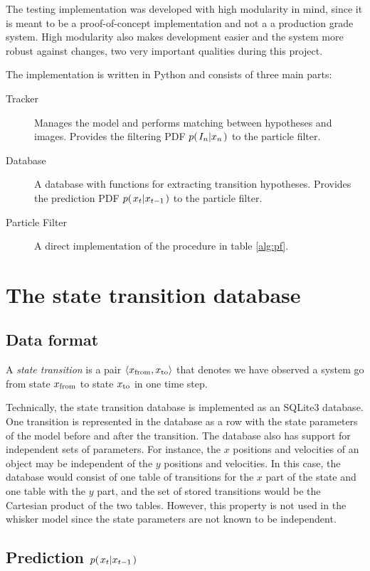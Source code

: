 The testing implementation was developed with high modularity in
mind, since it is meant to be a proof-of-concept implementation and
not a a production grade system. High modularity also makes
development easier and the system more robust against changes, two
very important qualities during this project.

The implementation is written in Python and consists of three main parts:
\begin{description}
  \item[Tracker] Manages the model and performs matching between
    hypotheses and images. Provides the filtering PDF
    $\cprob{I_n}{x_n}$ to the particle filter.
  \item[Database] A database with functions for extracting transition
    hypotheses. Provides the prediction PDF $\cprobnext{x}$ to the
    particle filter.
  \item[Particle Filter] A direct  implementation of the procedure in
    table \ref{alg:pf}.
\end{description}

\section{The state transition database}

\subsection{Data format}
A \emph{state transition} is a pair $\trans$ that denotes we have
observed a system go from state $\tf$ to state $\tt$ in one time step.

Technically, the state transition database is implemented as an SQLite3
database. One transition is represented in the database as a row with
the state parameters of the model before and after the
transition. The database also has support for independent sets of
parameters. For instance, the $x$ positions and velocities of an
object may be independent of the $y$ positions and velocities. In this
case, the database would consist of one table of transitions for the
$x$ part of the state and one table with the $y$ part, and the set of
stored transitions would be the Cartesian product of the two
tables. However, this property is not used in the whisker model since
the state parameters are not known to be independent.

\subsection{Prediction $\cprobnext{x}$}


